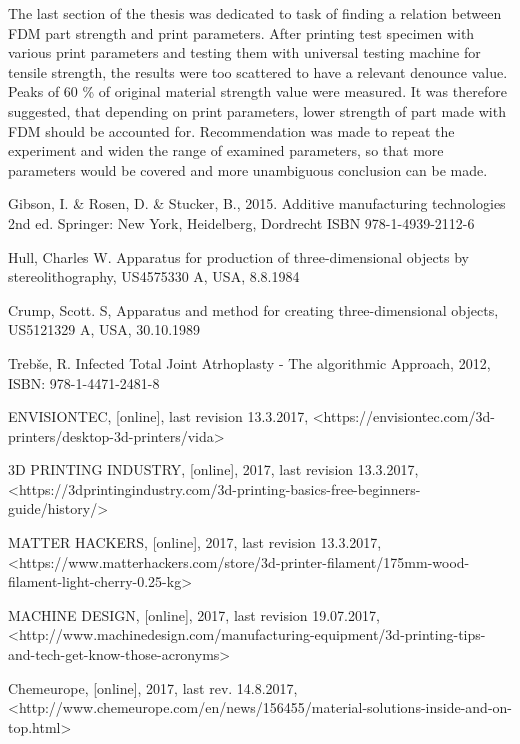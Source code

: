 \documentclass[a4paper, 11pt, reqno]{report}
\begin{document}
	The last section of the thesis was dedicated to task of finding a relation between FDM part strength and print parameters. After printing test specimen with various print parameters and testing them with universal testing machine for tensile strength, the results were too scattered  to have a relevant denounce value. Peaks of 60 \% of original material strength value were measured. It was therefore suggested, that depending on print parameters, lower strength of part made with FDM should be accounted for. Recommendation was made to repeat the experiment and widen the range of examined parameters, so that more parameters would be covered and more unambiguous conclusion can be made.
\begin{thebibliography}{99}
	Gibson, I. \& Rosen, D. \& Stucker, B.,
	2015.
	Additive manufacturing technologies
	2nd ed.
	Springer:
	New York, Heidelberg, Dordrecht
	ISBN 978-1-4939-2112-6
	
	Hull, Charles W.
	Apparatus for production of three-dimensional objects by stereolithography,
	US4575330 A,
	USA,
	8.8.1984
	
	Crump, Scott. S,
	Apparatus and method for creating three-dimensional objects,
	US5121329 A,
	USA,
	30.10.1989
	
	
	Trebše, R.
	Infected Total Joint Atrhoplasty - The algorithmic Approach,
	2012,
	ISBN: 978-1-4471-2481-8
	
	ENVISIONTEC,
	[online],
	last revision 13.3.2017,
	<https://envisiontec.com/3d-printers/desktop-3d-printers/vida>
	
	3D PRINTING INDUSTRY,
	[online],
	2017,
	last revision 13.3.2017,
	<https://3dprintingindustry.com/3d-printing-basics-free-beginners-guide/history/>
	
	MATTER HACKERS,
	[online],
	2017,
	last revision 13.3.2017,
	<https://www.matterhackers.com/store/3d-printer-filament/175mm-wood-filament-light-cherry-0.25-kg>
	
	MACHINE DESIGN,
	[online],
	2017,
	last revision 19.07.2017,
	<http://www.machinedesign.com/manufacturing-equipment/3d-printing-tips-and-tech-get-know-those-acronyms>
	
	Chemeurope,
	[online],
	2017,
	last rev. 14.8.2017,\\
	<http://www.chemeurope.com/en/news/156455/material-solutions-inside-and-on-top.html>	
	

\end{thebibliography}
\end{document}

